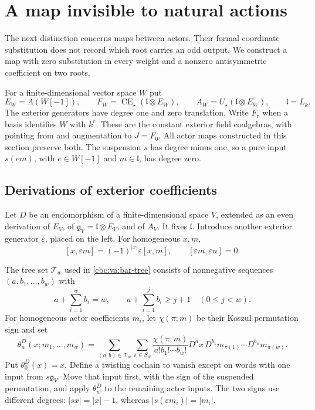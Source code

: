 \section{A map invisible to natural actions}
\label{cbc:rc:invisible-map}

The next distinction concerns maps between actors. Their
formal coordinate substitution does not record which root
carries an odd output. We construct a map with zero
substitution in every weight and a nonzero antisymmetric
coefficient on two roots.

For a finite-dimensional vector space $W$ put
\[
 E_W=\Lambda(W[-1]),\qquad
 F_W=\operatorname{CE}_\star(\mathfrak l\otimes E_W),
 \qquad A_W=U_\star(\mathfrak l\otimes E_W),\qquad
 \mathfrak l=L_k.
\]
The exterior generators have degree one and zero translation.
Write $F_r$ when a basis identifies $W$ with $k^r$.
These are the constant exterior field coalgebras, with
pointing from and augmentation to $J=F_0$.
All actor maps constructed in this section preserve both.
The suspension $s$ has degree minus one, so a pure input
$s(em)$, with $e\in W[-1]$ and $m\in\mathfrak l$, has
degree zero.

\subsection{Derivations of exterior coefficients}

Let $D$ be an endomorphism of a finite-dimensional space
$V$, extended as an even derivation of $E_V$, of
$\mathfrak g_V=\mathfrak l\otimes E_V$, and of $A_V$.
It fixes $\mathfrak l$. Introduce another exterior generator
$\varepsilon$, placed on the left. For homogeneous $x,m$,
\[
 [x,\varepsilon m]=(-1)^{|x|}\varepsilon[x,m],\qquad
 [\varepsilon m,\varepsilon n]=0.
\]

The tree set $\mathcal T_w$ used in
\eqref{cbc:va:bar-tree} consists of nonnegative sequences
$(a,b_1,\ldots,b_w)$ with
\[
 a+\sum_{i=1}^w b_i=w,\qquad
 a+\sum_{i=1}^j b_i\geq j+1\quad(0\leq j<w).
\]
For homogeneous actor coefficients $m_i$, let
$\chi(\pi;m)$ be their Koszul permutation sign and set
\begin{equation}\label{cbc:rc:graded-tree}
 \theta_w^D(x;m_1,\ldots,m_w)=
 \sum_{(a,b)\in\mathcal T_w}\sum_{\pi\in S_w}
 \frac{\chi(\pi;m)}{a!b_1!\cdots b_w!}
 D^ax\,D^{b_1}m_{\pi(1)}\cdots D^{b_w}m_{\pi(w)}.
\end{equation}
Put $\theta_0^D(x)=x$.
Define a twisting cochain to vanish except on words with
one input from $s\mathfrak g_V$. Move that input first,
with the sign of the suspended permutation, and apply
$\theta_w^D$ to the remaining actor inputs.
The two signs use different degrees:
$|sx|=|x|-1$, whereas $|s(\varepsilon m_i)|=|m_i|$.

